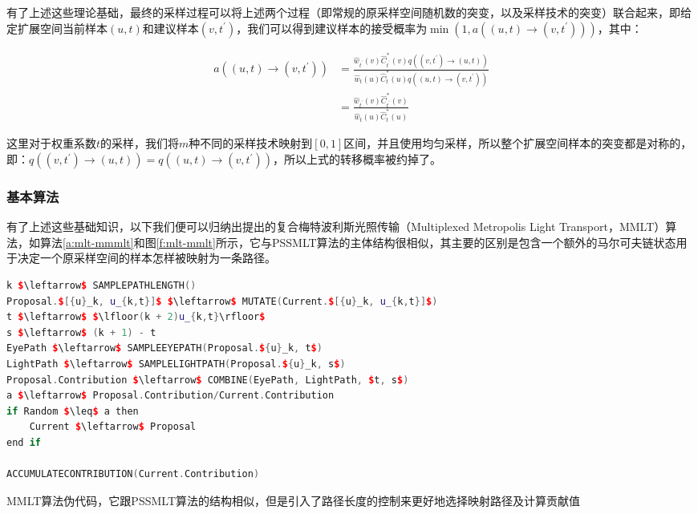 有了上述这些理论基础，最终的采样过程可以将上述两个过程（即常规的原采样空间随机数的突变，以及采样技术的突变）联合起来，即给定扩展空间当前样本$({u},t)$和建议样本$({v},t^{'})$，我们可以得到建议样本的接受概率为$\min(1,a(({u},t)\to({v},t^{'})))$，其中：

\begin{equation}\label{e:mlt-mmlt-acceptance}
\begin{aligned}
	a(({u},t)\to({v},t^{'}))&=\frac{\hat{w}_{t^{'}}({v})\hat{C}^{*}_{t^{'}}({v})q(({v},t^{'})\to({u},t))}{\hat{w}_t({u})\hat{C}^{*}_t({u})q(({u},t)\to({v},t^{'}))}\\
	&=\frac{\hat{w}_{t^{'}}({v})\hat{C}^{*}_{t^{'}}({v})}{\hat{w}_t({u})\hat{C}^{*}_t({u})}
\end{aligned}
\end{equation}

\noindent 这里对于权重系数$t$的采样，我们将$m$种不同的采样技术映射到$[0,1]$区间，并且使用均匀采样，所以整个扩展空间样本的突变都是对称的，即：$q(({v},t^{'})\to({u},t))=q(({u},t)\to({v},t^{'}))$，所以上式的转移概率被约掉了。




\subsubsection{基本算法}
有了上述这些基础知识，以下我们便可以归纳出\cite{a:MultiplexedMetropolisLightTransport}提出的复合梅特波利斯光照传输（Multiplexed Metropolis Light Transport，MMLT）算法，如算法\ref{a:mlt-mmmlt}和图\ref{f:mlt-mmlt}所示，它与PSSMLT算法的主体结构很相似，其主要的区别是包含一个额外的马尔可夫链状态用于决定一个原采样空间的样本怎样被映射为一条路径。

\begin{algorithm}
\begin{lstlisting}[language=C++, mathescape]
k $\leftarrow$ SAMPLEPATHLENGTH()
Proposal.$[{u}_k, u_{k,t}]$ $\leftarrow$ MUTATE(Current.$[{u}_k, u_{k,t}]$)
t $\leftarrow$ $\lfloor(k + 2)u_{k,t}\rfloor$
s $\leftarrow$ (k + 1) - t
EyePath $\leftarrow$ SAMPLEEYEPATH(Proposal.${u}_k, t$)
LightPath $\leftarrow$ SAMPLELIGHTPATH(Proposal.${u}_k, s$) 
Proposal.Contribution $\leftarrow$ COMBINE(EyePath, LightPath, $t, s$) 
a $\leftarrow$ Proposal.Contribution/Current.Contribution
if Random $\leq$ a then
	Current $\leftarrow$ Proposal
end if

ACCUMULATECONTRIBUTION(Current.Contribution)\end{lstlisting}
\caption{MMLT算法伪代码，它跟PSSMLT算法的结构相似，但是引入了路径长度的控制来更好地选择映射路径及计算贡献值}
\label{a:mlt-mmmlt}
\end{algorithm}

